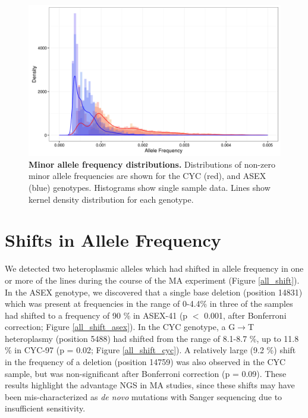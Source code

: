 \documentclass[12pt,twoside]{reedthesis}
\begin{document}

\begin{figure}[h!]
    \begin{center}
        \includegraphics[scale=0.6]{../figures/maf_distribution.jpeg}
    \end{center}
    \caption[Minor allele frequency distributions.]{\textbf{Minor allele frequency distributions.} Distributions of non-zero minor allele frequencies are shown for the CYC (red), and ASEX (blue) genotypes. Histograms show single sample data. Lines show kernel density distribution for each genotype.}
    \label{maf_distribution}
\end{figure}

\section{Shifts in Allele Frequency} 
We detected two heteroplasmic alleles which had shifted in allele frequency in one or more of the lines during the course of the \gls{MA} experiment (Figure \ref{all_shift}).
In the \gls{ASEX} genotype, we discovered that a single base deletion (position 14831) which was present at frequencies in the range of 0-4.4\% in three of the samples had shifted to a frequency of 90 \% in ASEX-41 (p $<$ 0.001, after Bonferroni correction; Figure \ref{all_shift_asex}).
In the \gls{CYC} genotype, a G$\rightarrow$T heteroplasmy (position 5488) had shifted from the range of 8.1-8.7 \%, up to 11.8 \% in CYC-97 (p = 0.02; Figure \ref{all_shift_cyc}).
A relatively large (9.2 \%) shift in the frequency of a deletion (position 14759) was also observed in the CYC sample, but was non-significant after Bonferroni correction (p = 0.09).
These results highlight the advantage \gls{NGS} in \gls{MA} studies, since these shifts may have been mis-characterized as \textit{de novo} mutations with Sanger sequencing due to insufficient sensitivity. 
\end{document}
